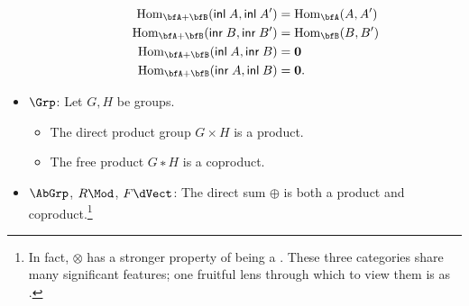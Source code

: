 \documentclass[./thesis.tex]{subfiles}
\begin{document}
\begin{example}
\begin{itemize}
\begin{itemize}
          \begin{align*}
            \Hom_{\bfA+\bfB}(\apply{\inl}{A}, \apply{\inl}{A'}) &= \Hom_{\bfA}(A,A') \\
            \Hom_{\bfA+\bfB}(\apply{\inr}{B}, \apply{\inr}{B'}) &= \Hom_{\bfB}(B,B') \\
            \Hom_{\bfA+\bfB}(\apply{\inl}{A}, \apply{\inr}{B}) &= \emptytype \\
            \Hom_{\bfA+\bfB}(\apply{\inr}{A}, \apply{\inl}{B}) &= \emptytype.
          \end{align*}
      \end{itemize}
    \item $\Grp$: Let $G,H$ be groups.
      \begin{itemize}\renewcommand{\labelitemi}{$∘$}
        \itemsep-0.2em
        \item \vspace{-0.6em} The direct product group $G×H$ is a product.
        \item The free product $G∗H$ is a coproduct.
      \end{itemize}
    \item $\AbGrp$, $R\Mod$, $F\dVect$: The direct sum $⊕$ is both a product and
      coproduct.\footnote{In fact, $⊗$ has a stronger property of being a
      . These three categories share many significant
      features; one fruitful lens through which to view them is as
      .} 
  \end{itemize}
\end{example}
\end{document}
